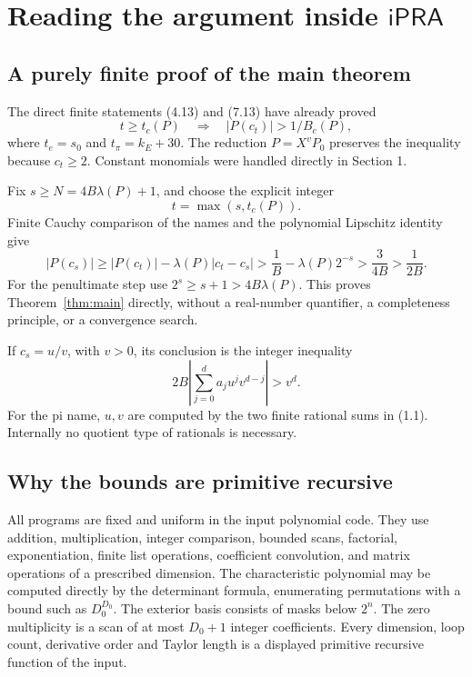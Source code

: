 \documentclass[11pt]{article}
\theoremstyle{definition}
\newcommand{\ipra}{\mathsf{iPRA}}
\begin{document}
\section{Reading the argument inside \texorpdfstring{\(\ipra\)}{iPRA}}
\label{sec:arithmetization}

\subsection{A purely finite proof of the main theorem}

The direct finite statements (4.13) and (7.13) have already proved
\[
 t\ge t_c(P)\quad\Longrightarrow\quad
 |P(c_t)|>1/B_c(P), \tag{8.1}
\]
where \(t_e=s_0\) and \(t_\pi=k_E+30\).
The reduction \(P=X^vP_0\) preserves the inequality because
\(c_t\ge2\). Constant monomials were handled directly in Section 1.

Fix \(s\ge N=4B\lambda(P)+1\), and choose the explicit integer
\[
 t=\max(s,t_c(P)).
\]
Finite Cauchy comparison of the names and the polynomial Lipschitz
identity give
\[
 |P(c_s)|\ge |P(c_t)|-\lambda(P)|c_t-c_s|
 >\frac1B-\lambda(P)2^{-s}>\frac{3}{4B}>\frac1{2B}. \tag{8.2}
\]
For the penultimate step use \(2^s\ge s+1>4B\lambda(P)\).
This proves Theorem~\ref{thm:main} directly, without a real-number
quantifier, a completeness principle, or a convergence search.

If \(c_s=u/v\), with \(v>0\), its conclusion is the integer inequality
\[
 2B\left|\sum_{j=0}^d a_j u^jv^{d-j}\right|>v^d.
 \tag{8.3}
\]
For the pi name, \(u,v\) are computed by the two finite rational sums
in (1.1). Internally no quotient type of rationals is necessary.

\subsection{Why the bounds are primitive recursive}

All programs are fixed and uniform in the input polynomial code.
They use addition, multiplication, integer comparison, bounded scans,
factorial, exponentiation, finite list operations, coefficient convolution,
and matrix operations of a prescribed dimension.
The characteristic polynomial may be computed directly by the determinant
formula, enumerating permutations with a bound such as \(D_0^{D_0}\).
The exterior basis consists of masks below \(2^n\). The zero
multiplicity is a scan of at most \(D_0+1\) integer coefficients.
Every dimension, loop count, derivative order and Taylor length is a
displayed primitive recursive function of the input.
\end{document}
